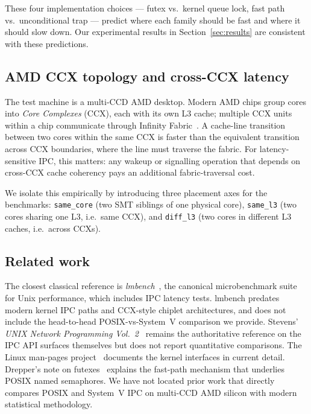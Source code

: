 \documentclass[a4paper,11pt]{article}
\begin{document}
These four implementation choices --- futex vs.\ kernel queue lock, fast
path vs.\ unconditional trap --- predict where each family should be fast
and where it should slow down. Our experimental results in
Section~\ref{sec:results} are consistent with these predictions.

\subsection{AMD CCX topology and cross-CCX latency}
\label{sec:bg:ccx}

The test machine is a multi-CCD AMD desktop. Modern AMD chips group cores
into \emph{Core Complexes} (CCX), each with its own L3 cache; multiple CCX
units within a chip communicate through Infinity
Fabric~\cite{amd_zen_arch, amd_infinity_fabric}. A cache-line transition
between two cores within the same CCX is faster than the equivalent
transition across CCX boundaries, where the line must traverse the fabric.
For latency-sensitive IPC, this matters: any wakeup or signalling
operation that depends on cross-CCX cache coherency pays an additional
fabric-traversal cost.

We isolate this empirically by introducing three placement axes for the
benchmarks:
\texttt{same\_core} (two SMT siblings of one physical core),
\texttt{same\_l3} (two cores sharing one L3, i.e.\ same CCX),
and \texttt{diff\_l3} (two cores in different L3 caches, i.e.\ across
CCXs).

\subsection{Related work}
The closest classical reference is \emph{lmbench}~\cite{mcvoy1996lmbench},
the canonical microbenchmark suite for Unix performance, which includes
IPC latency tests. lmbench predates modern kernel IPC paths and CCX-style
chiplet architectures, and does not include the head-to-head
POSIX-vs-System~V comparison we provide. Stevens'
\emph{UNIX Network Programming Vol.~2}~\cite{stevens1999} remains the
authoritative reference on the IPC API surfaces themselves but does not
report quantitative comparisons. The Linux man-pages
project~\cite{linux_mq_overview, linux_sysvipc, linux_futex} documents the
kernel interfaces in current detail. Drepper's note on
futexes~\cite{drepper2011futexes} explains the fast-path mechanism that
underlies POSIX named semaphores. We have not located prior work that
directly compares POSIX and System~V IPC on multi-CCD AMD silicon with
modern statistical methodology.
\end{document}
